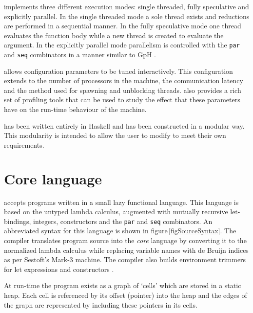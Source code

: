 \documentclass{llncs}
\begin{document}
\ample implements three different execution modes: single threaded, fully speculative and explicitly parallel. In the single threaded mode a sole thread exists and reductions are performed in a sequential manner. In the fully speculative mode one thread evaluates the function body while a new thread is created to evaluate the argument. In the explicitly parallel mode parallelism is controlled with the \texttt{par} and \texttt{seq} combinators in a manner similar to GpH \cite{trinder:strategies}.

\ample allows configuration parameters to be tuned interactively. This configuration extends to the number of processors in the machine, the communication latency and the method used for spawning and unblocking threads. \ample also provides a rich set of profiling tools that can be used to study the effect that these parameters have on the run-time behaviour of the machine.

\ample has been written entirely in Haskell and has been constructed in a modular way. This modularity is intended to allow the user to modify \ample to meet their own requirements. 


\section{Core language}
\ample accepts programs written in a small lazy functional language. This language is based on the untyped lambda calculus, augmented with mutually recursive let-bindings, integers, constructors and the \texttt{par} and \texttt{seq} combinators. An abbreviated syntax for this language is shown in figure\,\ref{figSourceSyntax}. The \ample compiler translates program source into the \ample \emph{core} language by converting it to the normalized lambda calculus while replacing variable names with de Bruijn indices as per Sestoft's \mbox{Mark-3} machine. The compiler also builds environment trimmers for let expressions and constructors \cite{sestoft:abstractmachine}.

At run-time the program exists as a graph of `cells' which are stored in a static heap. Each cell is referenced by its offset (pointer) into the heap and the edges of the graph are represented by including these pointers in its cells. 
\end{document}

